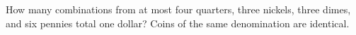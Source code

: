 How many combinations from at most four quarters, three nickels, three dimes, and six pennies total one dollar? Coins of the same denomination are identical.
